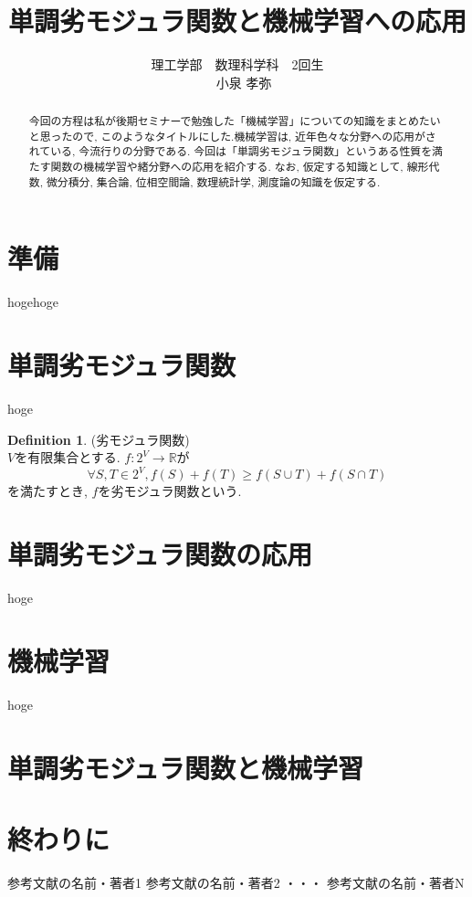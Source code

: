 \documentclass[11pt, a4paper, dvipdfmx]{jsarticle}
\title{単調劣モジュラ関数と機械学習への応用}
\author{理工学部　数理科学科　2回生\\　小泉 孝弥}
\date{}
\theoremstyle{definition}
\newtheorem{Definition+}[Axiom+]{Definition}
\begin{document}
\maketitle
\begin{abstract}
今回の方程は私が後期セミナーで勉強した「機械学習」についての知識をまとめたいと思ったので, このようなタイトルにした.機械学習は, 近年色々な分野への応用がされている, 今流行りの分野である. 今回は「単調劣モジュラ関数」というある性質を満たす関数の機械学習や緒分野への応用を紹介する. なお, 仮定する知識として, 線形代数, 微分積分, 集合論, 位相空間論, 数理統計学, 測度論の知識を仮定する.
\end{abstract}
\section{準備}
hogehoge
\section{単調劣モジュラ関数}
hoge
\begin{Definition+}
(劣モジュラ関数)\\
$V$を有限集合とする. $f:2^{V}\to\mathbb{R}$が
\begin{equation*}
\forall S,T\in 2^V, f(S)+f(T) \geq f(S\cup T)+f(S\cap T)
\end{equation*}
を満たすとき, $f$を劣モジュラ関数という.
\end{Definition+}
\section{単調劣モジュラ関数の応用}
hoge
\section{機械学習}
hoge
\section{単調劣モジュラ関数と機械学習}
\section{終わりに}
\begin{thebibliography}{10}
   参考文献の名前・著者1
   参考文献の名前・著者2
  ・・・
   参考文献の名前・著者N
\end{thebibliography}
\end{document}

